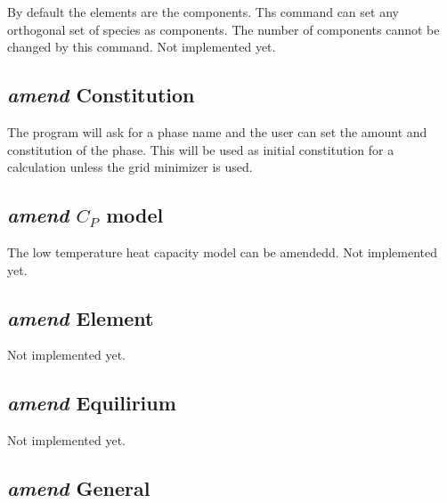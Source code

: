\documentclass[12pt]{article}
\begin{document}
By default the elements are the components.  Ths command can set any
orthogonal set of species as components.  The number of components
cannot be changed by this command.  Not implemented yet.

\subsection{{\em amend} Constitution}

The program will ask for a phase name and the user can set the amount
and constitution of the phase.  This will be used as initial
constitution for a calculation unless the grid minimizer is used.

\subsection{{\em amend} $C_P$ model}

The low temperature heat capacity model can be amendedd.  Not
implemented yet.

\subsection{{\em amend} Element}

Not implemented yet.

\subsection{{\em amend} Equilirium}

Not implemented yet.

\subsection{{\em amend} General}
\end{document}
